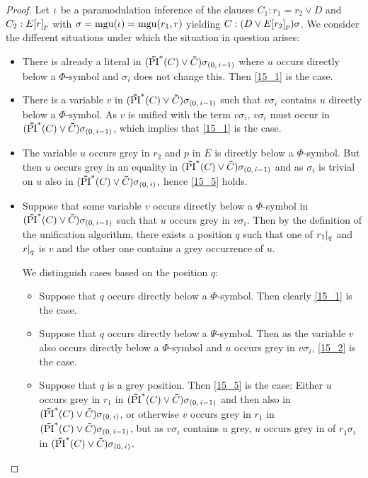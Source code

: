 \documentclass[%
	draft=false,%
	numbers=noendperiod,%
	11pt,%
	a4paper,%
	oneside,%
	openany,%
]{memoir}
\begin{document}
\begin{proof}
	Let  $\iota$ be a paramodulation inference  of the clauses $C_1: r_1=r_2 \lor D$ and $C_2: E{[r]_{p}}$ with $\sigma=\operatorname{mgu}(\iota)=\operatorname{mgu}(r_1, r)$ yielding $C: (D\lor E{[r_2]_{p}})\sigma$.
	We consider the different situations under which the situation in question arises:

	\begin{itemize}
		\item
			There is already a literal in $(\bm\tilde{\operatorname{PI}}^{*}(C)\lor \bm\tilde{C})\sigma_{(0,\,i-1)}$ where $u$ occurs directly below a $\Phi$-symbol and $\sigma_i$ does not change this.
			Then \ref{15_1} is the case.

		\item
			There is a variable $v$ in $(\bm\tilde{\operatorname{PI}}^{*}(C)\lor \bm\tilde{C})\sigma_{(0,\,i-1)}$ such that $v\sigma_i$ contains $u$ directly below a $\Phi$-symbol.
			As $v$ is unified with the term $v\sigma_i$, $v\sigma_i$ must occur in $(\bm\tilde{\operatorname{PI}}^{*}(C)\lor \bm\tilde{C})\sigma_{(0,\,i-1)}$, which implies that \ref{15_1} is the case.

		\item
			The variable $u$ occurs grey in $r_2$ and $p$ in $E$ is directly below a $\Phi$-symbol. 
			But then $u$ occurs grey in an equality in $(\bm\tilde{\operatorname{PI}}^{*}(C)\lor \bm\tilde{C})\sigma_{(0,\,i-1)}$ and as $\sigma_i$ is trivial on $u$ also in $(\bm\tilde{\operatorname{PI}}^{*}(C)\lor \bm\tilde{C})\sigma_{(0,\,i)}$, hence \ref{15_5} holds.

		\item
			Suppose that some variable $v$ occurs directly below a $\Phi$-symbol in $(\bm\tilde{\operatorname{PI}}^{*}(C)\lor \bm\tilde{C})\sigma_{(0,\,i-1)}$ such that $u$ occurs grey in $v\sigma_i$.
			Then by the definition of the unification algorithm, there exists a position $q$ such that one of $r_1|_{q}$ and $r|_{q}$ is $v$ and the other one contains a grey occurrence of $u$.

			We distinguish cases based on the position $q$:

			\begin{itemize}
				\item
					Suppose that $q$ occurs directly below a $\Phi$-symbol. Then clearly \ref{15_1} is the case.

				\item
					Suppose that $q$ occurs directly below a $\Psi$-symbol. Then as the variable $v$ also occurs directly below a $\Phi$-symbol and $u$ occurs grey in $v\sigma_i$, \ref{15_2} is the case.

				\item
					Suppose that $q$ is a grey position.
					Then \ref{15_5} is the case: 
					Either $u$ occurs grey in $r_1$ in $(\bm\tilde{\operatorname{PI}}^{*}(C)\lor \bm\tilde{C})\sigma_{(0,\,i-1)}$ and then also in $(\bm\tilde{\operatorname{PI}}^{*}(C)\lor \bm\tilde{C})\sigma_{(0,\,i)}$, 
					or otherwise $v$ occurs grey in $r_1$ in $(\bm\tilde{\operatorname{PI}}^{*}(C)\lor \bm\tilde{C})\sigma_{(0,\,i-1)}$, but as $v\sigma_i$ contains $u$ grey, $u$ occurs grey in of $r_1\sigma_i$ in $(\bm\tilde{\operatorname{PI}}^{*}(C)\lor \bm\tilde{C})\sigma_{(0,\,i)}$.
					\qedhere
			\end{itemize}

	\end{itemize}

\end{proof}
\end{document}

